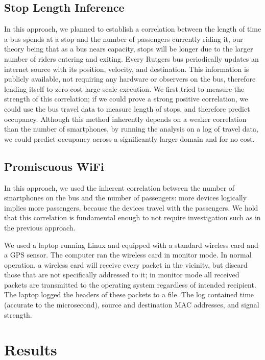 \documentclass[letterpaper,abstract=on,titlepage=false]{scrreprt}
\begin{document}
	\subsection*{Stop Length Inference}

	In this approach, we planned to establish a correlation between the length of time a bus spends at a stop and the number of passengers currently riding it, our theory being that as a bus nears capacity, stops will be longer due to the larger number of riders entering and exiting.
	Every Rutgers bus periodically updates an internet source with its position, velocity, and destination.
	This information is publicly available, not requiring any hardware or observers on the bus, therefore lending itself to zero-cost large-scale execution.
	We first tried to measure the strength of this correlation; if we could prove a strong positive correlation, we could use the bus travel data to measure length of stops, and therefore predict occupancy.
	Although this method inherently depends on a weaker correlation than the number of smartphones, by running the analysis on a log of travel data, we could predict occupancy across a significantly larger domain and for no cost.

	\subsection*{Promiscuous WiFi}

	In this approach, we used the inherent correlation between the number of smartphones on the bus and the number of passengers: more devices logically implies more passengers, because the devices travel with the passengers.
	We hold that this correlation is fundamental enough to not require investigation such as in the previous approach.

	We used a laptop running Linux and equipped with a standard wireless card and a GPS sensor.
	The computer ran the wireless card in monitor mode.
	In normal operation, a wireless card will receive every packet in the vicinity, but discard those that are not specifically addressed to it; in monitor mode all received packets are transmitted to the operating system regardless of intended recipient.
	The laptop logged the headers of these packets to a file.
	The log contained time (accurate to the microsecond), source and destination MAC addresses, and signal strength.

\section*{Results}
\end{document}

